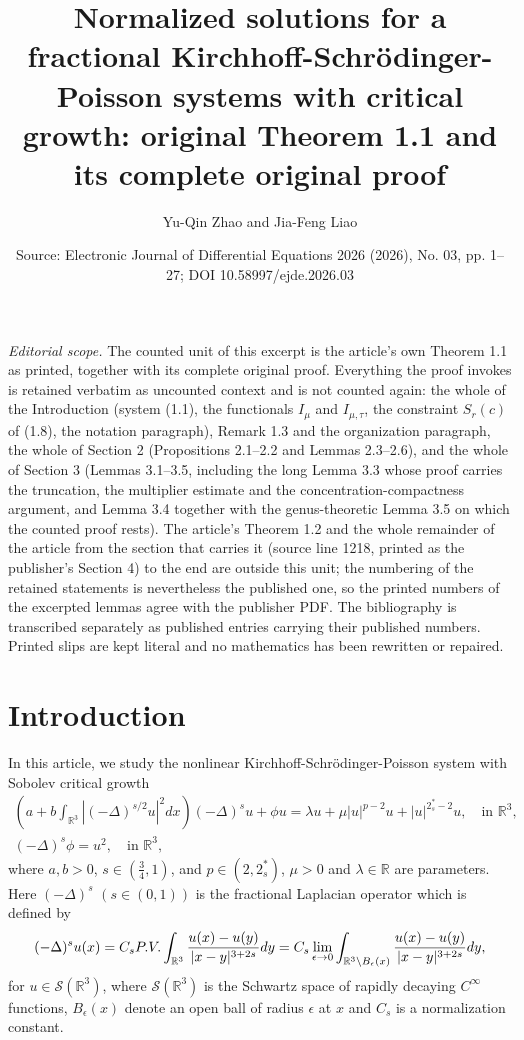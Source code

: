 \documentclass[10pt,a4paper]{amsart}
\title[Fractional Kirchhoff-Schr\"odinger-Poisson system: original Theorem 1.1]{Normalized solutions for a fractional Kirchhoff-Schr\"odinger-Poisson systems with critical growth: original Theorem 1.1 and its complete original proof}
\author{Yu-Qin Zhao and Jia-Feng Liao}
\date{Source: Electronic Journal of Differential Equations 2026 (2026), No. 03, pp. 1--27; DOI 10.58997/ejde.2026.03}
\numberwithin{equation}{section}
\begin{document}
\maketitle
\noindent\textit{Editorial scope.} The counted unit of this excerpt is the article's own Theorem 1.1 as printed, together with its complete original proof. Everything the proof invokes is retained verbatim as uncounted context and is not counted again: the whole of the Introduction (system (1.1), the functionals $I_\mu$ and $I_{\mu,\tau}$, the constraint $S_r(c)$ of (1.8), the notation paragraph), Remark 1.3 and the organization paragraph, the whole of Section 2 (Propositions 2.1--2.2 and Lemmas 2.3--2.6), and the whole of Section 3 (Lemmas 3.1--3.5, including the long Lemma 3.3 whose proof carries the truncation, the multiplier estimate and the concentration-compactness argument, and Lemma 3.4 together with the genus-theoretic Lemma 3.5 on which the counted proof rests). The article's Theorem 1.2 and the whole remainder of the article from the section that carries it (source line 1218, printed as the publisher's Section 4) to the end are outside this unit; the numbering of the retained statements is nevertheless the published one, so the printed numbers of the excerpted lemmas agree with the publisher PDF. The bibliography is transcribed separately as published entries carrying their published numbers. Printed slips are kept literal and no mathematics has been rewritten or repaired.
\section{Introduction}

In this article, we study the nonlinear Kirchhoff-Schr\"odinger-Poisson system
with Sobolev critical growth
\begin{equation}\label{lab1.1}
\begin{gathered}
(a+b\int_{\mathbb{R}^3}|(-\Delta)^{s/2}u|^2dx)(-\Delta)^s u+ \phi u
= \lambda u+\mu|u|^{p-2}u+|u|^{{2^*_s}-2}u,  \quad \text{in }\mathbb{R}^3, \\
(-\Delta)^s \phi=u^2, \quad   \text{in }\mathbb{R}^3,
\end{gathered}
\end{equation}
where $a,b>0$, $s\in(\frac{3}{4},1)$, and  $p \in(2,2^*_s)$,  $\mu>0$ and
$\lambda \in \mathbb{R}$ are parameters.
Here $(-\Delta)^s$ $(s\in(0,1))$ is the fractional Laplacian operator which is
defined by
$$
(-\Delta)^s u(x)=C_s {\rm P.V.}\int_{\mathbb{R}^3}\frac{u(x)-u(y)}{|x-y|^{3+2s}}dy
=C_s\lim_{\epsilon\to 0}\int_{{\mathbb{R}^3}
\setminus B_\epsilon(x)}\frac{u(x)-u(y)}{|x-y|^{3+2s}}dy,
$$
for $u\in \mathcal{S}(\mathbb{R}^3)$, where $\mathcal{S}(\mathbb{R}^3) $ is the
Schwartz space  of rapidly decaying $C^\infty$ functions, $B_\epsilon(x)$ denote an
open ball of radius $\epsilon$ at $x$ and $C_s$ is a normalization constant.
\end{document}
